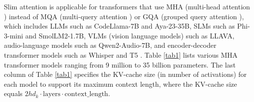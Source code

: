 \documentclass{article}
\begin{document}
Slim attention is applicable for transformers that use MHA (multi-head attention \citep{vanilla}) instead of MQA (multi-query attention \citep{MQA}) or GQA (grouped query attention \citep{GQA}), which includes LLMs such as CodeLlama-7B and Aya-23-35B, SLMs such as Phi-3-mini and SmolLM2-1.7B, VLMs (vision language models) such as LLAVA, audio-language models such as Qwen2-Audio-7B, and encoder-decoder transformer models such as Whisper \citep{whisper} and T5 \citep{T5}. Table \ref{tab1} lists various MHA transformer models ranging from 9 million to 35 billion parameters. The last column of Table \ref{tab1} specifies the KV-cache size (in number of activations) for each model to support its maximum context length, where the KV-cache size equals $2 h d_k \cdot \text{layers} \cdot \text{context\_length}$.

\begingroup \renewcommand{\arraystretch}{1.3} %
\end{document}

